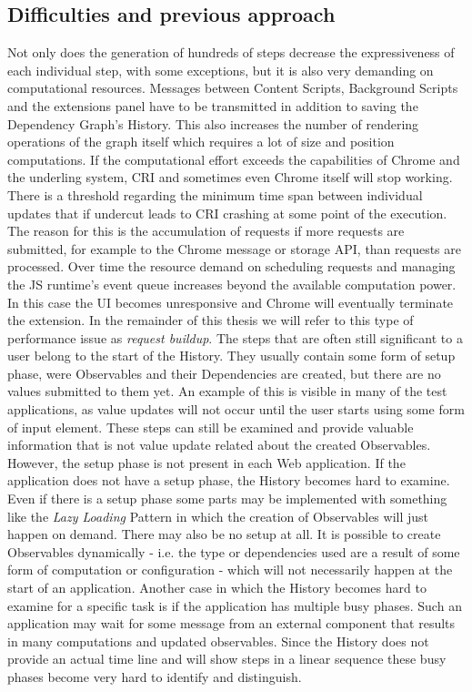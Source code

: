 \subsection{Difficulties and previous approach}
Not only does the generation of hundreds of steps decrease the expressiveness of each individual step, with some exceptions, but it is also very demanding on computational resources. Messages between Content Scripts, Background Scripts and the extensions panel have to be transmitted in addition to saving the Dependency Graph's History. This also increases the number of rendering operations of the graph itself which requires a lot of size and position computations. If the computational effort exceeds the capabilities of Chrome and the underling system, CRI and sometimes even Chrome itself will stop working. There is a threshold regarding the minimum time span between individual updates that if undercut leads to CRI crashing at some point of the execution. The reason for this is the accumulation of requests if more requests are submitted, for example to the Chrome message or storage API, than requests are processed. Over time the resource demand on scheduling requests and managing the JS runtime's event queue increases beyond the available computation power. In this case the UI becomes unresponsive and Chrome will eventually terminate the extension. In the remainder of this thesis we will refer to this type of performance issue as \emph{request buildup}.
The steps that are often still significant to a user belong to the start of the History. They usually contain some form of setup phase, were Observables and their Dependencies are created, but there are no values submitted to them yet. An example of this is visible in many of the test applications, as value updates will not occur until the user starts using some form of input element. These steps can still be examined and provide valuable information that is not value update related about the created Observables. However, the setup phase is not present in each Web application. If the application does not have a setup phase, the History becomes hard to examine. Even if there is a setup phase some parts may be implemented with something like the \emph{Lazy Loading} Pattern \cite{Lazy} in which the creation of Observables will just happen on demand. There may also be no setup at all. It is possible to create Observables dynamically - i.e. the type or dependencies used are a result of some form of computation or configuration - which will not necessarily happen at the start of an application. Another case in which the History becomes hard to examine for a specific task is if the application has multiple busy phases. Such an application may wait for some message from an external component that results in many computations and updated observables. Since the History does not provide an actual time line and will show steps in a linear sequence these busy phases become very hard to identify and distinguish. 
